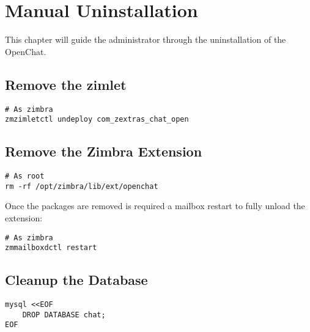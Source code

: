 \chapter{Manual Uninstallation}

\noindent This chapter will guide the administrator through the uninstallation of the OpenChat.

\section{Remove the zimlet}
\begin{verbatim}
# As zimbra
zmzimletctl undeploy com_zextras_chat_open
\end{verbatim}

\section{Remove the Zimbra Extension}
\begin{verbatim}
# As root
rm -rf /opt/zimbra/lib/ext/openchat
\end{verbatim}
Once the packages are removed is required a mailbox restart to fully unload the extension:
\begin{verbatim}
# As zimbra
zmmailboxdctl restart
\end{verbatim}

\section{Cleanup the Database}
\begin{verbatim}
mysql <<EOF     
	DROP DATABASE chat;
EOF
\end{verbatim}
